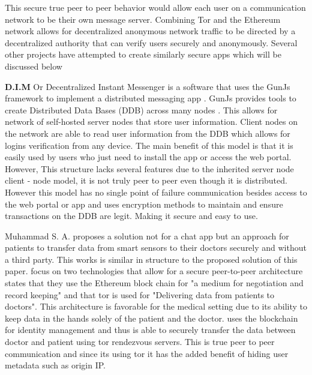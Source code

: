 \documentclass[../main/main.tex]{subfiles}
\begin{document}
This secure true peer to peer behavior would allow each user on a communication network to be their own message server.
Combining Tor and the Ethereum network allows for decentralized anonymous network traffic to be directed by a decentralized authority that can verify users securely and anonymously. 
Several other projects have attempted to create similarly secure apps which will be discussed below

\textbf{D.I.M} Or Decentralized Instant Messenger is a software that uses the GunJs framework to implement a distributed messaging app \cite{DIM}. %
GunJs provides tools to create Distributed Data Bases (DDB) across many nodes \cite{DIM}. 
This allows for network of self-hosted server nodes that store user information. 
Client nodes on the network are able to read user information from the DDB which allows for logins verification from any device. 
The main benefit of this model is that it is easily used by users who just need to install the app or access the web portal.
However, This structure lacks several features due to the inherited server node client - node model, it is not truly peer to peer even though it is distributed.  %
However this model has no single point of failure communication besides access to the web portal or app and uses encryption methods to maintain and ensure transactions on the DDB are legit. 
Making it secure and easy to use. 


Muhammad S. A.\cite{SENSE} proposes a solution not for a chat app but an approach for patients to transfer data from smart sensors to their doctors securely and without a third party. 
This works is similar in structure to the proposed solution of this paper. 
\cite{SENSE} focus on two technologies that allow for a secure peer-to-peer architecture 
\cite{SENSE} states that they use the Ethereum block chain for "a medium for negotiation and record keeping" and that tor is used for "Delivering data from patients to doctors".
This architecture is favorable for the medical setting due to its ability to keep data in the hands solely  of the patient and the doctor. 
\cite{SENSE} uses the blockchain for identity management and thus is able to securely transfer the data between doctor and patient using tor rendezvous servers.  
This is true peer to peer communication and since its using tor it has the added benefit of hiding user metadata such as origin IP. 
\end{document}
